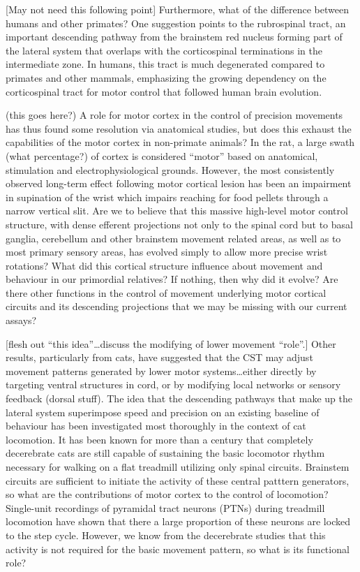 [May not need this following point] Furthermore, what of the difference between humans and other primates? One suggestion points to the rubrospinal tract, an important descending pathway from the brainstem red nucleus forming part of the lateral system that overlaps with the corticospinal terminations in the intermediate zone. In humans, this tract is much degenerated compared to primates and other mammals, emphasizing the growing dependency on the corticospinal tract for motor control that followed human brain evolution.

(this goes here?)
A role for motor cortex in the control of precision movements has thus found some resolution via anatomical studies, but does this exhaust the capabilities of the motor cortex in non-primate animals? In the rat, a large swath (what percentage?) of cortex is considered ``motor'' based on anatomical, stimulation and electrophysiological grounds. However, the most consistently observed long-term effect following motor cortical lesion has been an impairment in supination of the wrist which impairs reaching for food pellets through a narrow vertical slit. Are we to believe that this massive high-level motor control structure, with dense efferent projections not only to the spinal cord but to basal ganglia, cerebellum and other brainstem movement related areas, as well as to most primary sensory areas, has evolved simply to allow more precise wrist rotations? What did this cortical structure influence about movement and behaviour in our primordial relatives? If nothing, then why did it evolve? Are there other functions in the control of movement underlying motor cortical circuits and its descending projections that we may be missing with our current assays?




[flesh out “this idea”…discuss the modifying of lower movement “role”.]
Other results, particularly from cats, have suggested that the CST may adjust movement patterns generated by lower motor systems…either directly by targeting ventral structures in cord, or by modifying local networks or sensory feedback (dorsal stuff).
The idea that the descending pathways that make up the lateral system superimpose speed and precision on an existing baseline of behaviour has been investigated most thoroughly in the context of cat locomotion. It has been known for more than a century that completely decerebrate cats are still capable of sustaining the basic locomotor rhythm necessary for walking on a flat treadmill utilizing only spinal circuits. Brainstem circuits are sufficient to initiate the activity of these central patttern generators, so what are the contributions of motor cortex to the control of locomotion? Single-unit recordings of pyramidal tract neurons (PTNs) during treadmill locomotion have shown that there a large proportion of these neurons are locked to the step cycle. However, we know from the decerebrate studies that this activity is not required for the basic movement pattern, so what is its functional role?

